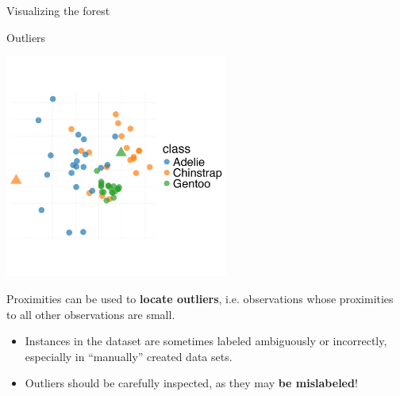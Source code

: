 \documentclass[11pt,compress,t,notes=noshow, xcolor=table]{beamer}
\begin{document}
\begin{vbframe}{Visualizing the forest}
\end{vbframe}

\begin{vbframe}{Outliers}
\vspace{-6ex}
\begin{center}
\includegraphics[width=0.55\textwidth]{figure/forest-prox-vis_2.png}
\end{center}
\vspace{-4ex}

Proximities can be used to \textbf{locate outliers}, i.e. observations whose proximities to all other observations are small.

\begin{itemize}
\item Instances in the dataset are sometimes labeled ambiguously or incorrectly, especially in \enquote{manually} created data sets.
\item Outliers should be carefully inspected, as they may \textbf{be mislabeled}!
\end{itemize}
\end{vbframe}
\end{document}
